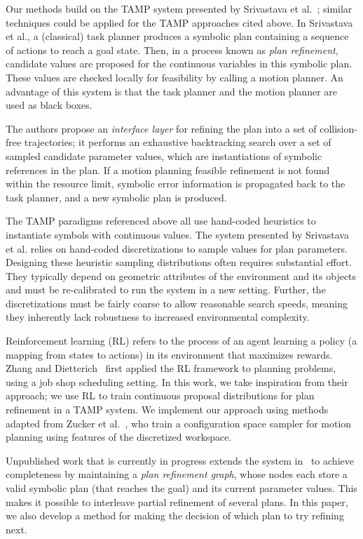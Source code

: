 Our methods build on the TAMP system presented by Srivastava et al.~\cite{srivastava2014combined};
similar techniques could be applied for the TAMP approaches cited above. In Srivastava et al.,
a (classical) task planner produces a symbolic plan containing
a sequence of actions to reach a goal state. Then, in a process known as \emph{plan refinement},
candidate values are proposed for the continuous variables in this symbolic plan.
These values are checked locally for feasibility by calling a motion planner.
An advantage of this system is that the task planner and the motion planner are used as black boxes.

The authors propose an \emph{interface layer} for refining the plan into a set
of collision-free trajectories; it performs an exhaustive backtracking search over a
set of sampled candidate parameter values, which are instantiations of symbolic references in the plan. If a motion planning feasible
refinement is not found within the resource limit, symbolic error information is
propagated back to the task planner, and a new symbolic plan is produced.

The TAMP paradigms referenced above all use hand-coded heuristics to instantiate symbols with continuous values.
The system presented by Srivastava et al. relies on hand-coded discretizations to sample values for
plan parameters. Designing these heuristic sampling distributions often requires substantial effort.
They typically depend on geometric attributes of the environment and its objects and must be
re-calibrated to run the system in a new setting. Further,
the discretizations must be fairly coarse to allow reasonable search speeds, meaning they inherently lack
robustness to increased environmental complexity.

Reinforcement learning (RL) refers to the process of an agent learning a policy (a mapping from states to actions)
in its environment that maximizes rewards. Zhang and Dietterich~\cite{JobShopSched} first applied the RL framework
to planning problems, using a job shop scheduling setting. In this work, we take inspiration from
their approach; we use RL to train continuous proposal distributions for
plan refinement in a TAMP system. We implement our approach using methods adapted from
Zucker et al.~\cite{workspacebias}, who train a configuration space sampler for motion planning
using features of the discretized workspace.

Unpublished work that is currently in progress extends the system in~\cite{srivastava2014combined} to achieve completeness by
maintaining a \emph{plan refinement graph}, whose nodes each store a valid
symbolic plan (that reaches the goal) and its current parameter values. This makes it possible to interleave
partial refinement of several plans. In this paper, we also develop a method for making the decision of
which plan to try refining next.


